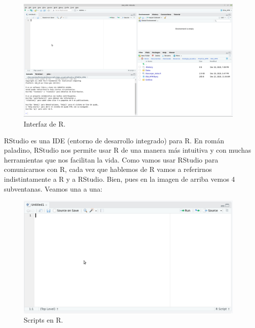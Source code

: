 \documentclass[
]{book}
\begin{document}
\begin{figure}

{\centering \includegraphics[width=1\linewidth]{Img/RStudio_interfaz} 

}

\caption{Interfaz de R.}\label{fig:unnamed-chunk-9}
\end{figure}

RStudio es una IDE (entorno de desarrollo integrado) para R. En román paladino, RStudio nos permite usar R de una manera más intuitiva y con muchas herramientas que nos facilitan la vida. Como vamos usar RStudio para comunicarnos con R, cada vez que hablemos de R vamos a referirnos indistintamente a R y a RStudio. Bien, pues en la imagen de arriba vemos 4 subventanas. Veamos una a una:

\begin{figure}

{\centering \includegraphics[width=1\linewidth]{Img/Script} 

}

\caption{Scripts en R.}\label{fig:unnamed-chunk-10}
\end{figure}
\end{document}
